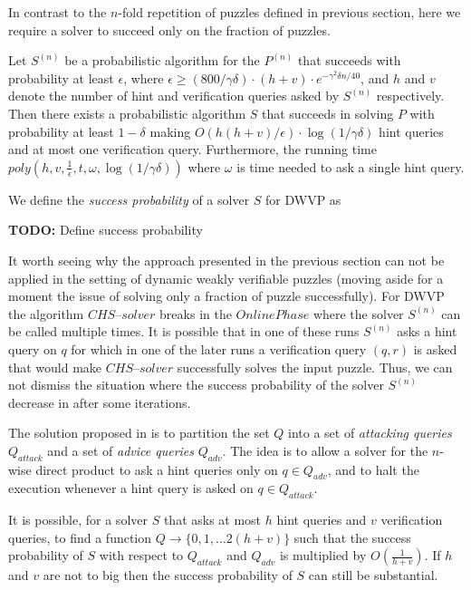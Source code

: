 In contrast to the $n$-fold repetition of puzzles defined in previous section, here we
require a solver to succeed only on the fraction of puzzles.

\begin{theorem}
Let $S^{(n)}$ be a probabilistic algorithm for the $P^{(n)}$ that succeeds with
probability at least $\epsilon$, where $\epsilon \geq (800/\gamma\delta) \cdot (h+v) \cdot e^{-\gamma^2\delta n/40}$, and $h$ and $v$
denote the number of hint and verification queries asked by $S^{(n)}$ respectively.
Then there exists a probabilistic algorithm $S$ that succeeds in solving $P$ with probability at least
$1-\delta$ making $O(h(h+v)/\epsilon) \cdot \log(1/\gamma\delta)$ hint queries and at most one verification query.
Furthermore, the running time $\mathit{poly}(h,v,\frac{1}{\epsilon}, t, \omega, \log(1/\gamma\delta))$ where
$\omega$ is time needed to ask a single hint query.
\end{theorem}

We define the \textit{success probability} of a solver $S$ for DWVP as
\begin{todo}
  \textbf{TODO:} Define success probability
\end{todo}

It worth seeing why the approach presented in the previous section can not be applied in the setting of dynamic weakly verifiable puzzles
(moving aside for a moment the issue of solving only a fraction of puzzle successfully).
For DWVP the algorithm $\mathit{CHS\text{--}solver}$ breaks in the $\mathit{OnlinePhase}$ where
the solver $S^{(n)}$ can be called multiple times.
It is possible that in one of these runs $S^{(n)}$ asks a hint query on $q$
for which in one of the later runs a verification query $(q,r)$ is asked
that would make $\mathit{CHS\text{--}solver}$ successfully solves the input puzzle.
Thus, we can not dismiss the situation where the success probability
of the solver $S^{(n)}$ decrease in after some iterations.

The solution proposed in \cite{Dodis:2009:SAI:1530441.1530450} is to partition the set $Q$ into a set of \textit{attacking queries} $Q_{\mathit{attack}}$
and a set of \textit{advice queries} $Q_{\mathit{adv}}$. The idea is to allow a solver for the $n$-wise direct product to ask a hint
queries only on $q \in Q_{\mathit{adv}}$, and to halt the execution whenever a hint query is asked on $q \in Q_{\mathit{attack}}$.

It is possible, for a solver $S$ that asks at most $h$ hint queries and $v$ verification queries,
to find a function $Q \rightarrow \{0,1,\dotsc 2(h+v)\}$ such that the success probability of $S$ with respect to
$Q_{\mathit{attack}}$ and $Q_{\mathit{adv}}$ is multiplied by $O(\frac{1}{h+v})$.
If $h$ and $v$ are not to big then the success probability of $S$ can still be substantial.

